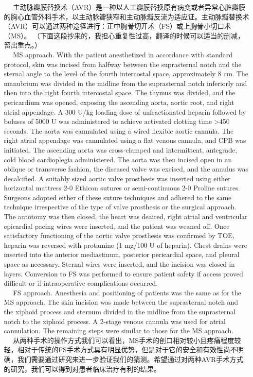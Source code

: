 \documentclass[
]{article}
\begin{document}
 
主动脉瓣膜替换术（AVR）是一种以人工瓣膜替换原有病变或者异常心脏瓣膜的胸心血管外科手术，以主动脉瓣狭窄和主动脉瓣反流为适应证。主动脉瓣替换术（AVR）可以通过两种途径进行：正中胸骨切开术（FS）或上胸骨小切口术（MS）。
（下面这段抄来的，我担心重复性过高，翻译的时候可以适当的删减，留出重点。）\\
  MS approach. With the patient anesthetized in accordance with standard
protocol, skin was incised from halfway between the suprasternal notch
and the sternal angle to the level of the fourth intercostal space,
approximately 8 cm. The manubrium was divided in the midline from the
suprasternal notch inferiorly and then into the right fourth intercostal
space. The thymus was divided, and the pericardium was opened, exposing
the ascending aorta, aortic root, and right atrial appendage. A 300 U/kg
loading dose of unfractionated heparin followed by boluses of 5000 U was
administered to achieve activated clotting time \textgreater450 seconds.
The aorta was cannulated using a wired flexible aortic cannula. The
right atrial appendage was cannulated using a flat venous cannula, and
CPB was initiated. The ascending aorta was cross-clamped and
intermittent, antegrade, cold blood cardioplegia administered. The aorta
was then incised open in an oblique or transverse fashion, the diseased
valve was excised, and the annulus was decalcified. A suitably sized
aortic valve prosthesis was inserted using either horizontal mattress
2-0 Ethicon sutures or semi-continuous 2-0 Proline sutures. Surgeons
adopted either of these suture techniques and adhered to the same
technique irrespective of the type of valve prosthesis or the surgical
approach. The autotomy was then closed, the heart was deaired, right
atrial and ventricular epicardial pacing wires were inserted, and the
patient was weaned off. Once satisfactory functioning of the aortic
valve prosthesis was confirmed by TOE, heparin was reversed with
protamine (1 mg/100 U of heparin). Chest drains were inserted into the
anterior mediastinum, posterior pericardial space, and pleural space as
necessary. Sternal wires were inserted, and the incision was closed in
layers. Conversion to FS was performed to ensure patient safety if
access proved difficult or if intraoperative complications occurred.\\
  FS approach. Anesthesia and positioning of patients was the same as
for the MS approach. The skin incision was made between the suprasternal
notch and the xiphoid process and sternum divided in the midline from
the suprasternal notch to the xiphoid process. A 2-stage venous cannula
was used for atrial cannulation. The remaining steps were similar to
those for the MS approach.\\
 
从两种手术的操作方式我们可以看出，MS手术的创口相对较小且疼痛程度较轻，相对于传统的FS手术方式具有明显优势，但是对于它的安全和有效性尚不明确，我们需要通过研究来进一步验证我们的猜测。希望通过对两种AVR手术方式的研究，我们可以得到对患者临床治疗有利的结果。
\end{document}
